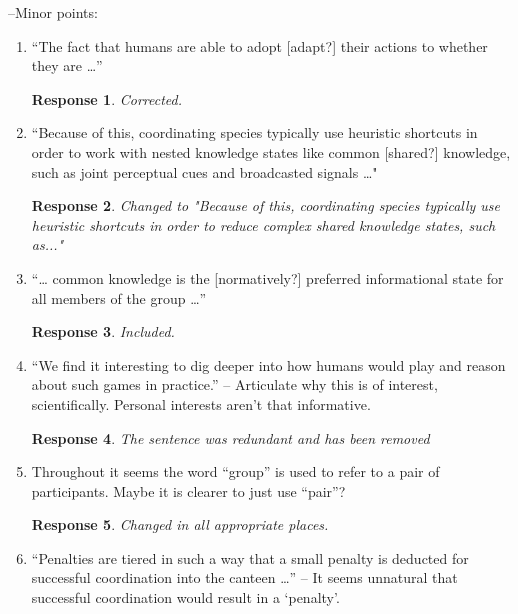 \documentclass[a4paper]{article}
\newtheorem{response}{Response}
\begin{document}
\medskip
--Minor points:
\begin{enumerate}
   \item[1.]    “The fact that humans are able to adopt [adapt?] their actions to whether they are …” \begin{response} Corrected. \end{response}
   \item[2.]    “Because of this, coordinating species typically use heuristic shortcuts in order to work with nested knowledge states like common [shared?] knowledge, such as joint perceptual cues and broadcasted signals …" \begin{response}Changed to "Because of this, coordinating species typically use heuristic shortcuts in order to reduce complex shared knowledge states, such as..."\end{response} 
  \item[4.]    “… common knowledge is the [normatively?] preferred informational state for all members of the group …” \begin{response} Included. \end{response}
  \item[5.]    “We find it interesting to dig deeper into how humans would play and reason about such games in practice.” – Articulate why this is of interest, scientifically. Personal interests aren’t that informative. \begin{response}The sentence was redundant and has been removed \end{response}
  \item[6.]    Throughout it seems the word “group” is used to refer to a pair of participants. Maybe it is clearer to just use “pair”?  \begin{response} Changed in all appropriate places. \end{response}
  \item[7.]    “Penalties are tiered in such a way that a small penalty is deducted for successful coordination into the canteen …” – It seems unnatural that successful coordination would result in a ‘penalty’.  
  

\end{enumerate}
\end{document}
